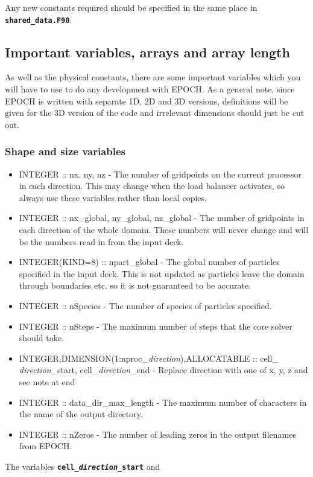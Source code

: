 \documentclass[12pt]{article}
\newcommand{\inlinecode}[1]{{\color{warwickred} \bf\texttt{#1}}}
\newcommand{\nEPOCH}{{\color{warwickdark}\fontfamily{phv}\selectfont EPOCH}}
\newcommand{\EPOCH}{{\nEPOCH} }
\begin{document}
Any new constants required should be specified in the same place in
\inlinecode{shared\_data.F90}.

\subsection{Important variables, arrays and array length}
As well as the physical constants, there are some important variables which
you will have to use to do any development with \nEPOCH. As a general note,
since \EPOCH is written with separate 1D, 2D and 3D versions, definitions will
be given for the 3D version of the code and irrelevant dimensions should just
be cut out.

\subsubsection{Shape and size variables}
\begin{itemize}
\item INTEGER :: nx. ny, nz - The number of gridpoints on the current
  processor in each direction. This may change when the load balancer
  activates, so always use these variables rather than local copies.
\item INTEGER :: nx\_global, ny\_global, nz\_global - The number of gridpoints
  in each direction of the whole domain. These numbers will never change and
  will be the numbers read in from the input deck.
\item INTEGER(KIND=8) :: npart\_global - The global number of particles
  specified in the input deck. This is not updated as particles leave the
  domain through boundaries etc. so it is not guaranteed to be accurate.
\item INTEGER :: nSpecies - The number of species of particles specified.
\item INTEGER :: nSteps - The maximum number of steps that the core solver
  should take.
\item INTEGER,DIMENSION(1:nproc\_{\it direction}),ALLOCATABLE :: cell\_{\it
    direction}\_start, cell\_{\it direction}\_end - Replace direction with one
  of x, y, z and see note at end
\item INTEGER :: data\_dir\_max\_length - The maximum number of characters in
  the name of the output directory.
\item INTEGER :: nZeros - The number of leading zeros in the output filenames
  from \nEPOCH.
\end{itemize}
The variables \inlinecode{cell\_{\it direction}\_start} and
\end{document}
